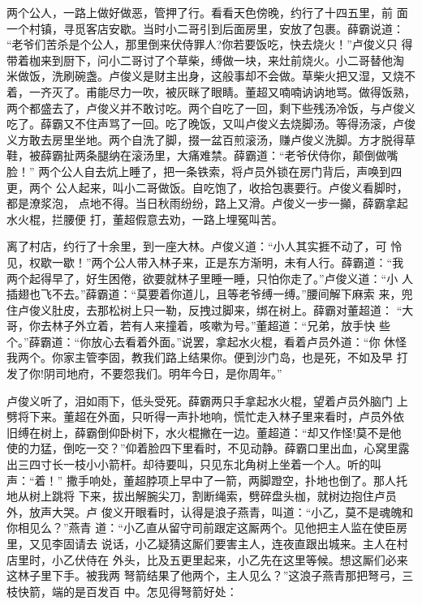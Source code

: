 两个公人，一路上做好做恶，管押了行。看看天色傍晚，约行了十四五里，前
面一个村镇，寻觅客店安歇。当时小二哥引到后面房里，安放了包裹。薛霸说道：
“老爷们苦杀是个公人，那里倒来伏侍罪人?你若要饭吃，快去烧火！”卢俊义只
得带着枷来到厨下，问小二哥讨了个草柴，缚做一块，来灶前烧火。小二哥替他淘
米做饭，洗刷碗盏。卢俊义是财主出身，这般事却不会做。草柴火把又湿，又烧不
着，一齐灭了。甫能尽力一吹，被灰眯了眼睛。董超又喃喃讷讷地骂。做得饭熟，
两个都盛去了，卢俊义并不敢讨吃。两个自吃了一回，剩下些残汤冷饭，与卢俊义
吃了。薛霸又不住声骂了一回。吃了晚饭，又叫卢俊义去烧脚汤。等得汤滚，卢俊
义方敢去房里坐地。两个自洗了脚，掇一盆百煎滚汤，赚卢俊义洗脚。方才脱得草
鞋，被薛霸扯两条腿纳在滚汤里，大痛难禁。薛霸道：“老爷伏侍你，颠倒做嘴脸！”
两个公人自去炕上睡了，把一条铁索，将卢员外锁在房门背后，声唤到四更，两个
公人起来，叫小二哥做饭。自吃饱了，收拾包裹要行。卢俊义看脚时，都是潦浆泡，
点地不得。当日秋雨纷纷，路上又滑。卢俊义一步一攧，薛霸拿起水火棍，拦腰便
打，董超假意去劝，一路上埋冤叫苦。

离了村店，约行了十余里，到一座大林。卢俊义道：“小人其实捱不动了，可
怜见，权歇一歇！”两个公人带入林子来，正是东方渐明，未有人行。薛霸道：“我
两个起得早了，好生困倦，欲要就林子里睡一睡，只怕你走了。”卢俊义道：“小
人插翅也飞不去。”薛霸道：“莫要着你道儿，且等老爷缚一缚。”腰间解下麻索
来，兜住卢俊义肚皮，去那松树上只一勒，反拽过脚来，绑在树上。薛霸对董超道：
“大哥，你去林子外立着，若有人来撞着，咳嗽为号。”董超道：“兄弟，放手快
些个。”薛霸道：“你放心去看着外面。”说罢，拿起水火棍，看着卢员外道：“你
休怪我两个。你家主管李固，教我们路上结果你。便到沙门岛，也是死，不如及早
打发了你!阴司地府，不要怨我们。明年今日，是你周年。”

卢俊义听了，泪如雨下，低头受死。薛霸两只手拿起水火棍，望着卢员外脑门
上劈将下来。董超在外面，只听得一声扑地响，慌忙走入林子里来看时，卢员外依
旧缚在树上，薛霸倒仰卧树下，水火棍撇在一边。董超道：“却又作怪!莫不是他
使的力猛，倒吃一交？”仰着脸四下里看时，不见动静。薛霸口里出血，心窝里露
出三四寸长一枝小小箭杆。却待要叫，只见东北角树上坐着一个人。听的叫声：“着！”
撒手响处，董超脖项上早中了一箭，两脚蹬空，扑地也倒了。那人托地从树上跳将
下来，拔出解腕尖刀，割断绳索，劈碎盘头枷，就树边抱住卢员外，放声大哭。卢
俊义开眼看时，认得是浪子燕青，叫道：“小乙，莫不是魂魄和你相见么？”燕青
道：“小乙直从留守司前跟定这厮两个。见他把主人监在使臣房里，又见李固请去
说话，小乙疑猜这厮们要害主人，连夜直跟出城来。主人在村店里时，小乙伏侍在
外头，比及五更里起来，小乙先在这里等候。想这厮们必来这林子里下手。被我两
弩箭结果了他两个，主人见么？”这浪子燕青那把弩弓，三枝快箭，端的是百发百
中。怎见得弩箭好处：

